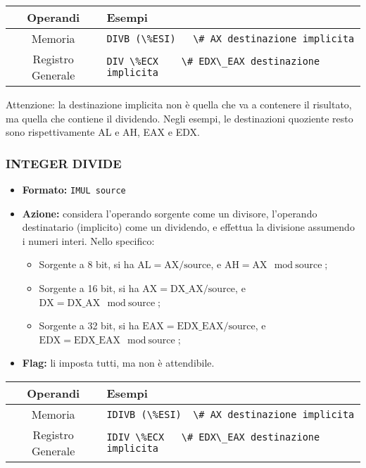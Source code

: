\documentclass[a4paper,11pt]{article}
\begin{document}
		\begin{table}[H]
		\center {}
			\begin{tabular} { c | p{10cm} }
				\bfseries Operandi & \bfseries Esempi \\
				\hline
				Memoria & \lstinline!DIVB (\%ESI)	\# AX destinazione implicita! \\ 
				Registro Generale & \lstinline|DIV \%ECX	\# EDX\_EAX destinazione implicita|
			\end{tabular}
		\end{table}

Attenzione: la destinazione implicita non è quella che va a contenere il risultato, ma quella che contiene il dividendo.
Negli esempi, le destinazioni quoziente resto sono rispettivamente AL e AH, EAX e EDX.

\subsubsection{INTEGER DIVIDE}
\begin{itemize}
	\item \textbf{Formato:} \lstinline|IMUL source|
	\item \textbf{Azione:} considera l'operando sorgente come un divisore, l'operando destinatario (implicito) come un dividendo, e effettua la divisione assumendo i numeri interi. Nello specifico:
	\begin{itemize}
	\item Sorgente a 8 bit, si ha $\text{AL} = \text{AX} / \text{source}$, e $ \text{AH} = \text{AX} \mod \text{source} $;
	\item Sorgente a 16 bit, si ha $\text{AX} = \text{DX\_AX} / \text{source}$, e $ \text{DX} = \text{DX\_AX} \mod \text{source} $;
	\item Sorgente a 32 bit, si ha $\text{EAX} = \text{EDX\_EAX} / \text{source}$, e $ \text{EDX} = \text{EDX\_EAX} \mod \text{source} $;
	\end{itemize}
	\item \textbf{Flag:} li imposta tutti, ma non è attendibile.
\end{itemize}

		\begin{table}[H]
		\center {}
			\begin{tabular} { c | p{10cm} }
				\bfseries Operandi & \bfseries Esempi \\
				\hline
				Memoria & \lstinline|IDIVB (\%ESI)	\# AX destinazione implicita| \\ 
				Registro Generale & \lstinline|IDIV \%ECX	\# EDX\_EAX destinazione implicita|
			\end{tabular}
		\end{table}
\end{document}

